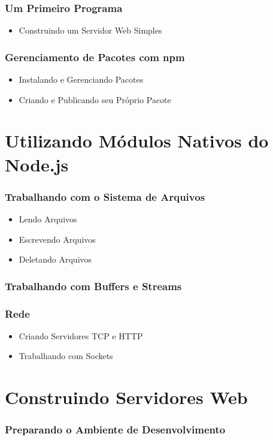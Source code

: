 \subsubsection{Um Primeiro Programa}
\begin{itemize}
\item Construindo um Servidor Web Simples
\end{itemize}
\subsubsection{Gerenciamento de Pacotes com npm}
\begin{itemize}
\item Instalando e Gerenciando Pacotes
\item Criando e Publicando seu Próprio Pacote
\end{itemize}

\section{Utilizando Módulos Nativos do Node.js}
\subsubsection{Trabalhando com o Sistema de Arquivos}
\begin{itemize}
\item Lendo Arquivos
\item Escrevendo Arquivos
\item Deletando Arquivos
\end{itemize}
\subsubsection{Trabalhando com Buffers e Streams}
\subsubsection{Rede}
\begin{itemize}
\item Criando Servidores TCP e HTTP
\item Trabalhando com Sockets
\end{itemize}


\section{Construindo Servidores Web}
\subsubsection{Preparando o Ambiente de Desenvolvimento}
